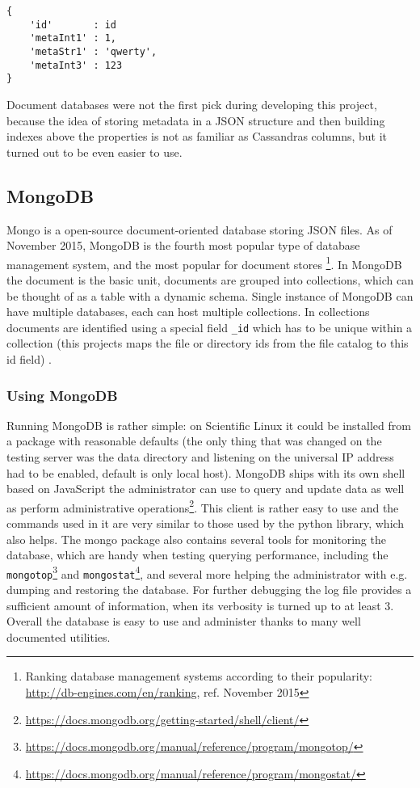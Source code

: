 \begin{verbatim}
{
	'id'       : id
	'metaInt1' : 1,
	'metaStr1' : 'qwerty',
	'metaInt3' : 123
}
\end{verbatim}


Document databases were not the first pick during developing this project, because the idea of
storing metadata in a JSON structure and then building indexes above the properties is not as
familiar as Cassandras columns, but it turned out to be even easier to use.

\subsection{MongoDB}

Mongo is a open-source document-oriented database storing JSON files. As of November 2015, MongoDB is the fourth 
most popular type of database management system, and the most popular for document stores 
\footnote{Ranking database management systems according to their popularity: \url{http://db-engines.com/en/ranking}, ref. November 2015}. 
In MongoDB the document is the basic unit, documents are grouped into collections, which can be thought of as 
a table with a dynamic schema. Single instance of MongoDB can have multiple databases, each can host multiple 
collections. In collections documents are identified using a special field \texttt{\_id} which has to be unique
within a collection\cite{MongoBook} (this projects maps the file or directory ids from the file catalog 
to this id field) .

\subsubsection{Using MongoDB}

Running MongoDB is rather simple: on Scientific Linux it could be installed from a package with reasonable 
defaults (the only thing that was changed on the testing server was the data directory and listening on the 
universal IP address had to be enabled, default is only local host). MongoDB ships with its own shell based on
JavaScript the administrator can use to query and update data as well as perform administrative 
operations\footnote{\url{https://docs.mongodb.org/getting-started/shell/client/}}. This client is rather easy to
use and the commands used in it are very similar to those used by the python library, which also helps. The mongo
package also contains several tools for monitoring the database, which are handy when testing querying performance,
including the \texttt{mongotop}\footnote{\url{https://docs.mongodb.org/manual/reference/program/mongotop/}} 
and \texttt{mongostat}\footnote{\url{https://docs.mongodb.org/manual/reference/program/mongostat/}}, and several 
more helping the administrator with e.g. dumping and restoring the database. For further 
debugging the log file provides a sufficient amount of information, when its verbosity is turned up to at least 3.
Overall the database is easy to use and administer thanks to many well documented utilities. 

